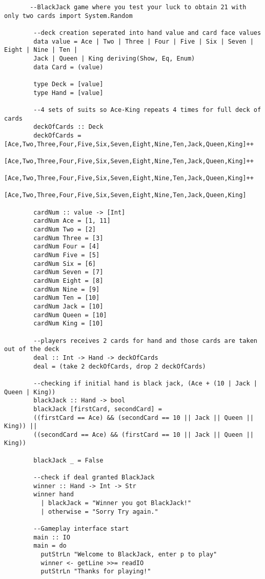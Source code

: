 \documentclass{article}
\begin{document}
    \begin{lstlisting}
       --BlackJack game where you test your luck to obtain 21 with only two cards import System.Random

        --deck creation seperated into hand value and card face values
        data value = Ace | Two | Three | Four | Five | Six | Seven | Eight | Nine | Ten |
        Jack | Queen | King deriving(Show, Eq, Enum)
        data Card = (value)

        type Deck = [value]
        type Hand = [value]
        
        --4 sets of suits so Ace-King repeats 4 times for full deck of cards
        deckOfCards :: Deck
        deckOfCards = [Ace,Two,Three,Four,Five,Six,Seven,Eight,Nine,Ten,Jack,Queen,King]++
                      [Ace,Two,Three,Four,Five,Six,Seven,Eight,Nine,Ten,Jack,Queen,King]++
                      [Ace,Two,Three,Four,Five,Six,Seven,Eight,Nine,Ten,Jack,Queen,King]++
                      [Ace,Two,Three,Four,Five,Six,Seven,Eight,Nine,Ten,Jack,Queen,King]
        
        cardNum :: value -> [Int]
        cardNum Ace = [1, 11]
        cardNum Two = [2]
        cardNum Three = [3]
        cardNum Four = [4]
        cardNum Five = [5]
        cardNum Six = [6]
        cardNum Seven = [7]
        cardNum Eight = [8]
        cardNum Nine = [9]
        cardNum Ten = [10]
        cardNum Jack = [10]
        cardNum Queen = [10]
        cardNum King = [10]
        
        --players receives 2 cards for hand and those cards are taken out of the deck
        deal :: Int -> Hand -> deckOfCards
        deal = (take 2 deckOfCards, drop 2 deckOfCards)
        
        --checking if initial hand is black jack, (Ace + (10 | Jack | Queen | King))
        blackJack :: Hand -> bool
        blackJack [firstCard, secondCard] = 
        ((firstCard == Ace) && (secondCard == 10 || Jack || Queen || King)) ||
        ((secondCard == Ace) && (firstCard == 10 || Jack || Queen || King))
        
        blackJack _ = False
        
        --check if deal granted BlackJack
        winner :: Hand -> Int -> Str
        winner hand
          | blackJack = "Winner you got BlackJack!"
          | otherwise = "Sorry Try again."
        
        --Gameplay interface start
        main :: IO
        main = do
          putStrLn "Welcome to BlackJack, enter p to play"
          winner <- getLine >>= readIO
          putStrLn "Thanks for playing!"

    \end{lstlisting}
\end{document}
